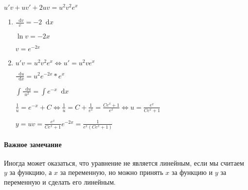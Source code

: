 \documentclass{article}
\newcommand*\diff{\mathop{}\!\mathrm{d}}
\begin{document}
$u' v + uv' + 2 u v = u^2 v^2 e^x$

\begin{enumerate}
    \item $\frac{\diff v}{v} = -2 \diff x$

    $\ln v = - 2 x$

    $v = e^{- 2x}$
    \item $u' v = u^2 v^2 e^{x} \Longleftrightarrow u' = u^2 v e^{x}$

    $\frac{\diff u}{\diff x} = u^2 e^{-2x} * e^{x}$

    $\int \frac{\diff u}{u^2} = \int e^{-x} \diff x$

    $\frac{1}{u} = e^{-x} + C \Longleftrightarrow \frac{1}{u} = C + \frac{1}{e^{x}} = \frac{C e^{x} + 1}{e^{x}} \Longleftrightarrow u = \frac{e^{x}}{C e^{x} + 1}$

    $y = u v = \frac{e^{x}}{C e^{x} + 1} e^{-2x} = \frac{1}{e^{x} (C e^{x} + 1)}$
\end{enumerate}

\paragraph{Важное замечание}

Иногда может оказаться, что уравнение не является линейным, если мы считаем $y$ за функцию, а $x$ за переменную, но можно принять $x$ за функцию и $y$ за переменную и сделать его линейным.
\end{document}
